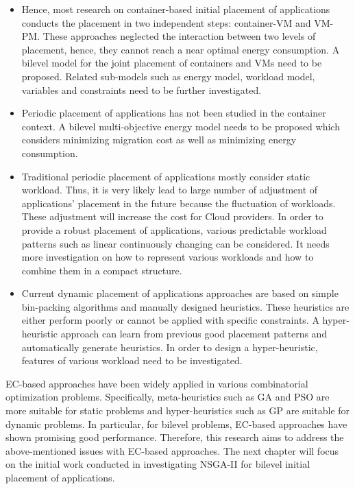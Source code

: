 \begin{itemize}
	\item {} Hence, most research on container-based initial placement of applications conducts the placement in two independent steps: container-VM and VM-PM. These approaches neglected the interaction between two levels of placement, hence, they cannot reach a near optimal energy consumption. A bilevel model for the joint placement of containers and VMs need to be proposed. Related sub-models such as energy model, workload model, variables and constraints need to be further investigated.
	\item Periodic placement of applications has not been studied in the container context. A bilevel multi-objective energy model needs to be proposed which considers minimizing migration cost as well as minimizing energy consumption. 
	\item Traditional periodic placement of applications mostly consider static workload. Thus, it is very likely lead to large number of adjustment of applications' placement in the future because the fluctuation of workloads. These adjustment will increase the cost for Cloud providers. In order to provide a robust placement of applications, various predictable workload patterns such as linear continuously changing can be considered. It needs more investigation on how to represent various workloads and how to combine them in a compact structure.
	\item Current dynamic placement of applications approaches are based on simple bin-packing algorithms and manually designed heuristics. These heuristics are either perform poorly or cannot be applied with specific constraints. A hyper-heuristic approach can learn from previous good placement patterns and automatically generate heuristics. In order to design a hyper-heuristic, features of various workload need to be investigated. 
\end{itemize}

EC-based approaches have been widely applied in various combinatorial optimization problems. Specifically, meta-heuristics such as GA and PSO are more suitable for static problems and hyper-heuristics such as GP are suitable for dynamic problems. In particular, for bilevel problems, EC-based approaches have shown promising good performance. Therefore, this research aims to address the above-mentioned issues with EC-based approaches. The next chapter will focus on the initial work conducted in investigating NSGA-II for bilevel initial placement of applications.

